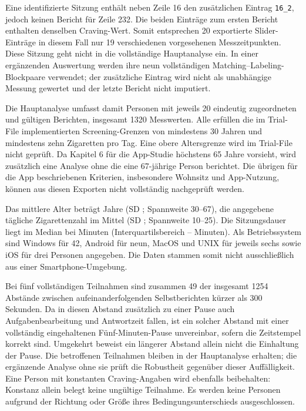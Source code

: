 Eine identifizierte Sitzung enthält neben Zeile 16 den zusätzlichen Eintrag \texttt{16\_2}, jedoch keinen Bericht für Zeile 232. Die beiden Einträge zum ersten Bericht enthalten denselben Craving-Wert. Somit entsprechen 20 exportierte Slider-Einträge in diesem Fall nur 19 verschiedenen vorgesehenen Messzeitpunkten. Diese Sitzung geht nicht in die vollständige Hauptanalyse ein. In einer ergänzenden Auswertung werden ihre neun vollständigen Matching--Labeling-Blockpaare verwendet; der zusätzliche Eintrag wird nicht als unabhängige Messung gewertet und der letzte Bericht nicht imputiert.

Die Hauptanalyse umfasst damit \TestableN{} Personen mit jeweils 20 eindeutig zugeordneten und gültigen Berichten, insgesamt 1320 Messwerten. Alle erfüllen die im Trial-File implementierten Screening-Grenzen von mindestens 30 Jahren und mindestens zehn Zigaretten pro Tag. Eine obere Altersgrenze wird im Trial-File nicht geprüft. Da Kapitel 6 für die App-Studie höchstens 65 Jahre vorsieht, wird zusätzlich eine Analyse ohne die eine 67-jährige Person berichtet. Die übrigen für die App beschriebenen Kriterien, insbesondere Wohnsitz und App-Nutzung, können aus diesen Exporten nicht vollständig nachgeprüft werden.

Das mittlere Alter beträgt \TestableAge{} Jahre (SD \TestableSDAge{}; Spannweite 30--67), die angegebene tägliche Zigarettenzahl im Mittel \TestableCigs{} (SD \TestableSDCigs{}; Spannweite 10--25). Die Sitzungsdauer liegt im Median bei \TestableDuration{} Minuten (Interquartilsbereich \TestableDurationQone{}--\TestableDurationQthree{} Minuten). Als Betriebssystem sind Windows für 42, Android für neun, MacOS und UNIX für jeweils sechs sowie iOS für drei Personen angegeben. Die Daten stammen somit nicht ausschließlich aus einer Smartphone-Umgebung.

Bei fünf vollständigen Teilnahmen sind zusammen 49 der insgesamt 1254 Abstände zwischen aufeinanderfolgenden Selbstberichten kürzer als 300 Sekunden. Da in diesen Abstand zusätzlich zu einer Pause auch Aufgabenbearbeitung und Antwortzeit fallen, ist ein solcher Abstand mit einer vollständig eingehaltenen Fünf-Minuten-Pause unvereinbar, sofern die Zeitstempel korrekt sind. Umgekehrt beweist ein längerer Abstand allein nicht die Einhaltung der Pause. Die betroffenen Teilnahmen bleiben in der Hauptanalyse erhalten; die ergänzende Analyse ohne sie prüft die Robustheit gegenüber dieser Auffälligkeit. Eine Person mit konstanten Craving-Angaben wird ebenfalls beibehalten: Konstanz allein belegt keine ungültige Teilnahme. Es werden keine Personen aufgrund der Richtung oder Größe ihres Bedingungsunterschieds ausgeschlossen.

